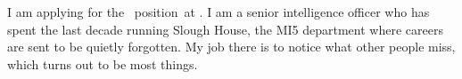 
I am applying for the \theposition\ position\maybeteam\ at \theemployer\maybejobref. I am a senior intelligence officer who has spent the last decade running Slough House, the MI5 department where careers are sent to be quietly forgotten. My job there is to notice what other people miss, which turns out to be most things.\maybeappsentence
